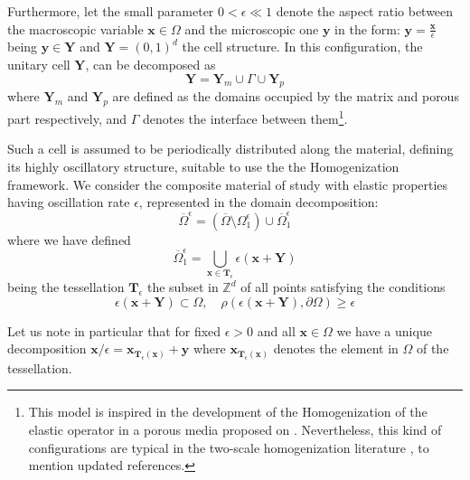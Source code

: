 Furthermore, let the small parameter $0 < \epsilon \ll 1$ denote the aspect ratio between the macroscopic variable $\mathbf{x} \in \Omega$ and the microscopic one $\mathbf{y}$ in the form: $\mathbf{y} = \frac{\mathbf{x}}{\epsilon}$ being $\mathbf{y} \in \mathbf{Y}$ and $\mathbf{Y} = (0,1)^d$ the cell structure. In this configuration, the unitary cell $\mathbf{Y}$, can be decomposed as
\begin{equation*}
	\mathbf{Y} = \mathbf{Y}_m \cup \Gamma \cup \mathbf{Y}_p 
\end{equation*}
where $\mathbf{Y}_m$ and $\mathbf{Y}_p$ are defined as the domains occupied by the matrix and porous part respectively, and $\Gamma$ denotes the interface between them\footnote{This model is inspired in the development of the Homogenization of the elastic operator in a porous media proposed on \cite{christensen1982theory}. Nevertheless, this kind of configurations are typical in the two-scale homogenization literature \cite{panasenko2005multi-scale}, \cite{Boughammoura2013} to mention updated references.}.

Such a cell is assumed to be periodically distributed along the material, defining its highly oscillatory structure, suitable to use the the Homogenization framework. We consider the composite material of study with elastic properties having oscillation rate $\epsilon$, represented in the domain decomposition:
\begin{equation*}
	\overline{\Omega}^{\epsilon} = (\overline{\Omega}\setminus \Omega_1^{\epsilon}) \cup \overline{\Omega}^{\epsilon}_1
\end{equation*}
where we have defined
\begin{equation*}
    \overline{\Omega}^{\epsilon}_1 = \bigcup_{\mathbf{x} \in \mathbf{T}_{\epsilon}} \epsilon ( \mathbf{x} + \mathbf{Y} )
\end{equation*}
being the tessellation $\mathbf{T}_{\epsilon}$ the subset in $\mathbb{Z}^d$ of all points satisfying the conditions
\begin{equation*}
    \epsilon (\mathbf{x} + \mathbf{Y}) \subset \Omega, \quad \rho(\epsilon(\mathbf{x}+\mathbf{Y}), \partial \Omega) \geq \epsilon
\end{equation*}

Let us note in particular that for fixed $\epsilon >0$ and all $\mathbf{x} \in \Omega$ we have a unique decomposition $\mathbf{x}/\epsilon = \mathbf{x}_{\mathbf{T}_{\epsilon}(\mathbf{x})} + \mathbf{y}$ where $\mathbf{x}_{\mathbf{T}_{\epsilon}(\mathbf{x})}$ denotes the element in $\Omega$ of the tessellation.

